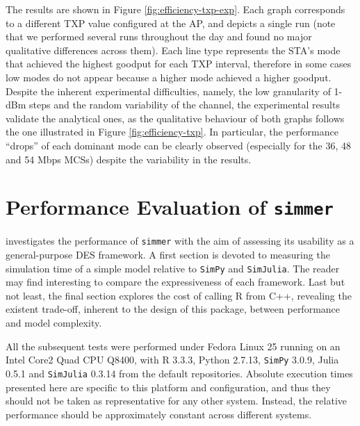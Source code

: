 \documentclass[twoside,nohyper]{tufte-book}
\theoremstyle{definition}
\theoremstyle{definition}
\theoremstyle{definition}
\theoremstyle{remark}
\begin{document}
The results are shown in Figure \ref{fig:efficiency-txp-exp}. Each graph
corresponds to a different TXP value configured at the AP, and depicts a
single run (note that we performed several runs throughout the day and
found no major qualitative differences across them). Each line type
represents the STA's mode that achieved the highest goodput for each TXP
interval, therefore in some cases low modes do not appear because a
higher mode achieved a higher goodput. Despite the inherent experimental
difficulties, namely, the low granularity of 1-dBm steps and the random
variability of the channel, the experimental results validate the
analytical ones, as the qualitative behaviour of both graphs follows the
one illustrated in Figure \ref{fig:efficiency-txp}. In particular, the
performance ``drops'' of each dominant mode can be clearly observed
(especially for the 36, 48 and 54 Mbps MCSs) despite the variability in
the results.

\hypertarget{performance-evaluation-of-simmer}{%
\chapter{\texorpdfstring{Performance Evaluation of
\texttt{simmer}}{Performance Evaluation of simmer}}\label{performance-evaluation-of-simmer}}

 investigates the performance of
\texttt{simmer} with the aim of assessing its usability as a
general-purpose DES framework. A first section is devoted to measuring
the simulation time of a simple model relative to
\texttt{SimPy}\cite[0pt]{SimPy}
and
\texttt{SimJulia}\cite[0pt]{GitHub:SimJulia}.
The reader may find interesting to compare the expressiveness of each
framework. Last but not least, the final section explores the cost of
calling R from C++, revealing the existent trade-off, inherent to the
design of this package, between performance and model complexity.

All the subsequent tests were performed under Fedora Linux 25 running on
an Intel Core2 Quad CPU Q8400, with R 3.3.3, Python 2.7.13,
\texttt{SimPy} 3.0.9, Julia 0.5.1 and \texttt{SimJulia} 0.3.14 from the
default repositories. Absolute execution times presented here are
specific to this platform and configuration, and thus they should not be
taken as representative for any other system. Instead, the relative
performance should be approximately constant across different systems.
\end{document}
